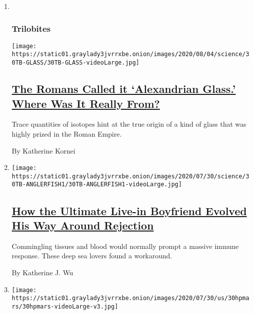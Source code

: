 \begin{enumerate}
\def\labelenumi{\arabic{enumi}.}
\item ~
  \hypertarget{trilobites-1}{%
  \subsubsection{Trilobites}\label{trilobites-1}}

  \texttt{[image: https://static01.graylady3jvrrxbe.onion/images/2020/08/04/science/30TB-GLASS/30TB-GLASS-videoLarge.jpg]}

  \hypertarget{the-romans-called-it-alexandrian-glass-where-was-it-really-from}{%
  \subsection{\texorpdfstring{\href{/2020/07/31/science/alexandrian-glass-rome.html}{The
  Romans Called it `Alexandrian Glass.' Where Was It Really
  From?}}{The Romans Called it `Alexandrian Glass.' Where Was It Really From?}}\label{the-romans-called-it-alexandrian-glass-where-was-it-really-from}}

  Trace quantities of isotopes hint at the true origin of a kind of
  glass that was highly prized in the Roman Empire.

  By Katherine Kornei
\item
  \texttt{[image: https://static01.graylady3jvrrxbe.onion/images/2020/07/30/science/30TB-ANGLERFISH1/30TB-ANGLERFISH1-videoLarge.jpg]}

  \hypertarget{how-the-ultimate-live-in-boyfriend-evolved-his-way-around-rejection}{%
  \subsection{\texorpdfstring{\href{/2020/07/30/science/anglerfish-immune-rejection.html}{How
  the Ultimate Live-in Boyfriend Evolved His Way Around
  Rejection}}{How the Ultimate Live-in Boyfriend Evolved His Way Around Rejection}}\label{how-the-ultimate-live-in-boyfriend-evolved-his-way-around-rejection}}

  Commingling tissues and blood would normally prompt a massive immune
  response. These deep sea lovers found a workaround.

  By Katherine J. Wu
\item
  \texttt{[image: https://static01.graylady3jvrrxbe.onion/images/2020/07/30/us/30hpmars/30hpmars-videoLarge-v3.jpg]}

  \hypertarget{nasa-launches-perseverance-rover-capping-summer-of-missions-to-mars}{%
}
\end{enumerate}
